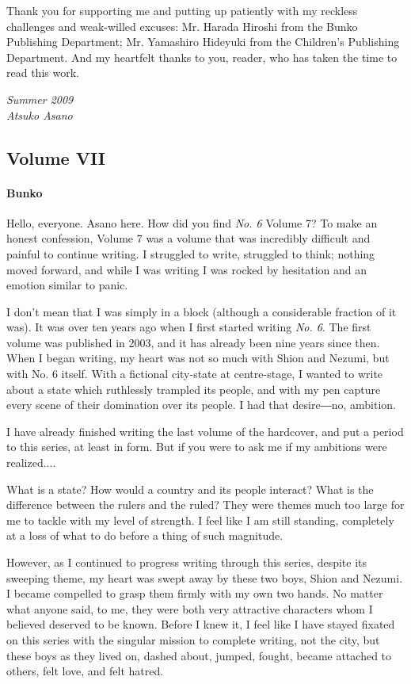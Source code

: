 Thank you for supporting me and putting up patiently with my reckless
challenges and weak-willed excuses: Mr. Harada Hiroshi from the Bunko
Publishing Department; Mr. Yamashiro Hideyuki from the Children's
Publishing Department. And my heartfelt thanks to you, reader, who has
taken the time to read this work.

\myspace

\emph{Summer 2009\\
	Atsuko Asano}

\subsection{Volume VII}
\paragraph{Bunko}

Hello, everyone. Asano here. How did you find \emph{No. 6} Volume 7? To make an honest confession, Volume 7 was a volume that was incredibly difficult and painful to continue writing. I struggled to write, struggled to think; nothing moved forward, and while I was writing I was rocked by hesitation and an emotion similar to panic.

I don't mean that I was simply in a block (although a considerable fraction of it was). It was over ten years ago when I first started writing \emph{No. 6}. The first volume was published in 2003, and it has already been nine years since then. When I began writing, my heart was not so much with Shion and Nezumi, but with No. 6 itself. With a fictional city-state at centre-stage, I wanted to write about a state which ruthlessly trampled its people, and with my pen capture every scene of their domination over its people. I had that desire―no, ambition.

I have already finished writing the last volume of the hardcover, and put a period to this series, at least in form. But if you were to ask me if my ambitions were realized....

What is a state? How would a country and its people interact? What is the difference between the rulers and the ruled? They were themes much too large for me to tackle with my level of strength. I feel like I am still standing, completely at a loss of what to do before a thing of such magnitude.

However, as I continued to progress writing through this series, despite its sweeping theme, my heart was swept away by these two boys, Shion and Nezumi. I became compelled to grasp them firmly with my own two hands. No matter what anyone said, to me, they were both very attractive characters whom I believed deserved to be known. Before I knew it, I feel like I have stayed fixated on this series with the singular mission to complete writing, not the city, but these boys as they lived on, dashed about, jumped, fought, became attached to others, felt love, and felt hatred.

